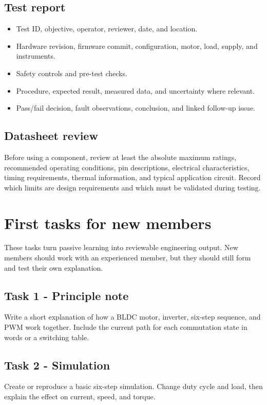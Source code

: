 \documentclass[11pt,a4paper]{article}
\begin{document}
\subsection{Test report}
\begin{itemize}
  \item Test ID, objective, operator, reviewer, date, and location.
  \item Hardware revision, firmware commit, configuration, motor, load, supply, and instruments.
  \item Safety controls and pre-test checks.
  \item Procedure, expected result, measured data, and uncertainty where relevant.
  \item Pass/fail decision, fault observations, conclusion, and linked follow-up issue.
\end{itemize}

\subsection{Datasheet review}

Before using a component, review at least the absolute maximum ratings,
recommended operating conditions, pin descriptions, electrical
characteristics, timing requirements, thermal information, and typical
application circuit. Record which limits are design requirements and which
must be validated during testing.

\section{First tasks for new members}

These tasks turn passive learning into reviewable engineering output. New
members should work with an experienced member, but they should still form and
test their own explanation.

\subsection{Task 1 - Principle note}
Write a short explanation of how a BLDC motor, inverter, six-step sequence,
and PWM work together. Include the current path for each commutation state in
words or a switching table.

\subsection{Task 2 - Simulation}
Create or reproduce a basic six-step simulation. Change duty cycle and load,
then explain the effect on current, speed, and torque.
\end{document}
